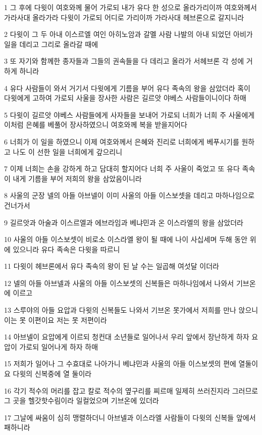 \par 1 그 후에 다윗이 여호와께 물어 가로되 내가 유다 한 성으로 올라가리이까 여호와께서 가라사대 올라가라 다윗이 가로되 어디로 가리이까 가라사대 헤브론으로 갈지니라
\par 2 다윗이 그 두 아내 이스르엘 여인 아히노암과 갈멜 사람 나발의 아내 되었던 아비가일을 데리고 그리로 올라갈 때에
\par 3 또 자기와 함께한 종자들과 그들의 권속들을 다 데리고 올라가 서헤브론 각 성에 거하게 하니라
\par 4 유다 사람들이 와서 거기서 다윗에게 기름을 부어 유다 족속의 왕을 삼았더라 혹이 다윗에게 고하여 가로되 사울을 장사한 사람은 길르앗 야베스 사람들이니이다 하매
\par 5 다윗이 길르앗 야베스 사람들에게 사자들을 보내어 가로되 너희가 너희 주 사울에게 이처럼 은혜를 베풀어 장사하였으니 여호와께 복을 받을지어다
\par 6 너희가 이 일을 하였으니 이제 여호와께서 은혜와 진리로 너희에게 베푸시기를 원하고 나도 이 선한 일을 너희에게 갚으리니
\par 7 이제 너희는 손을 강하게 하고 담대히 할지어다 너희 주 사울이 죽었고 또 유다 족속이 내게 기름을 부어 저희의 왕을 삼았음이니라
\par 8 사울의 군장 넬의 아들 아브넬이 이미 사울의 아들 이스보셋을 데리고 마하나임으로 건너가서
\par 9 길르앗과 아술과 이스르엘과 에브라임과 베냐민과 온 이스라엘의 왕을 삼았더라
\par 10 사울의 아들 이스보셋이 비로소 이스라엘 왕이 될 때에 나이 사십세며 두해 동안 위에 있으니라 유다 족속은 다윗을 따르니
\par 11 다윗이 헤브론에서 유다 족속의 왕이 된 날 수는 일곱해 여섯달 이더라
\par 12 넬의 아들 아브넬과 사울의 아들 이스보셋의 신복들은 마하나임에서 나와서 기브온에 이르고
\par 13 스루야의 아들 요압과 다윗의 신복들도 나와서 기브온 못가에서 저희를 만나 앉으니 이는 못 이편이요 저는 못 저편이라
\par 14 아브넬이 요압에게 이르되 청컨대 소년들로 일어나서 우리 앞에서 장난하게 하자 요압이 가로되 일어나게 하자 하매
\par 15 저희가 일어나 그 수효대로 나아가니 베냐민과 사울의 아들 이스보셋의 편에 열둘이요 다윗의 신복중에 열 둘이라
\par 16 각기 적수의 머리를 잡고 칼로 적수의 옆구리를 찌르매 일제히 쓰러진지라 그러므로 그 곳을 헬갓핫수림이라 일컬었으며 기브온에 있더라
\par 17 그날에 싸움이 심히 맹렬하더니 아브넬과 이스라엘 사람들이 다윗의 신복들 앞에서 패하니라
